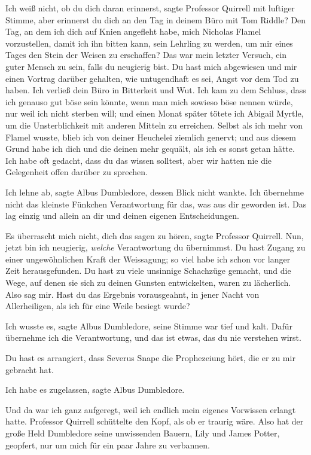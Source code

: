 \glqq Ich weiß nicht, ob du dich daran erinnerst\grqq{}, sagte Professor
Quirrell mit luftiger Stimme, \glqq aber erinnerst du dich an den Tag in deinem
Büro mit Tom Riddle? Den Tag, an dem ich dich auf Knien angefleht habe, mich
Nicholas Flamel vorzustellen, damit ich ihn bitten kann, sein Lehrling zu
werden, um mir eines Tages den Stein der Weisen zu erschaffen? Das war mein
letzter Versuch, ein guter Mensch zu sein, falls du neugierig bist. Du hast mich
abgewiesen und mir einen Vortrag darüber gehalten, wie untugendhaft es sei,
Angst vor dem Tod zu haben. Ich verließ dein Büro in Bitterkeit und Wut. Ich kam
zu dem Schluss, dass ich genauso gut böse sein könnte, wenn man mich sowieso
böse nennen würde, nur weil ich nicht sterben will; und einen Monat später
tötete ich Abigail Myrtle, um die Unsterblichkeit mit anderen Mitteln zu
erreichen. Selbst als ich mehr von Flamel wusste, blieb ich von deiner Heuchelei
ziemlich genervt; und aus diesem Grund habe ich dich und die deinen mehr
gequält, als ich es sonst getan hätte. Ich habe oft gedacht, dass du das wissen
solltest, aber wir hatten nie die Gelegenheit offen darüber zu sprechen.\grqq{}

\glqq Ich lehne ab\grqq{}, sagte Albus Dumbledore, dessen Blick nicht wankte.
\glqq Ich übernehme nicht das kleinste Fünkchen Verantwortung für das, was aus
dir geworden ist. Das lag einzig und allein an dir und deinen eigenen
Entscheidungen.\grqq{}

\glqq Es überrascht mich nicht, dich das sagen zu hören\grqq{}, sagte Professor
Quirrell. \glqq Nun, jetzt bin ich neugierig, \emph{welche} Verantwortung du
übernimmst. Du hast Zugang zu einer ungewöhnlichen Kraft der Weissagung; so viel
habe ich schon vor langer Zeit herausgefunden. Du hast zu viele unsinnige
Schachzüge gemacht, und die Wege, auf denen sie sich zu deinen Gunsten
entwickelten, waren zu lächerlich. Also sag mir. Hast du das Ergebnis
vorausgeahnt, in jener Nacht von Allerheiligen, als ich für eine Weile besiegt
wurde?\grqq{}

\glqq Ich wusste es\grqq{}, sagte Albus Dumbledore, seine Stimme war tief und
kalt. \glqq Dafür übernehme ich die Verantwortung, und das ist etwas, das du nie
verstehen wirst.\grqq{}

\glqq Du hast es arrangiert, dass Severus Snape die Prophezeiung hört, die er zu
mir gebracht hat.\grqq{}

\glqq Ich habe es zugelassen\grqq{}, sagte Albus Dumbledore.

\glqq Und da war ich ganz aufgeregt, weil ich endlich mein eigenes Vorwissen
erlangt hatte.\grqq{} Professor Quirrell schüttelte den Kopf, als ob er traurig
wäre. \glqq Also hat der große Held Dumbledore seine unwissenden Bauern, Lily
und James Potter, geopfert, nur um mich für ein paar Jahre zu verbannen.\grqq{}

